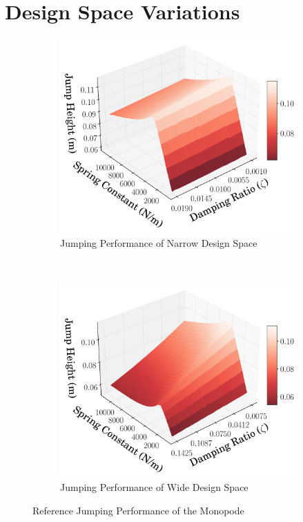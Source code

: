 \section{Design Space Variations}
% 
\begin{figure}[tb!]
        \centering
        \begin{subfigure}{0.75\textwidth}
        \centering
        \includegraphics[width=\linewidth]{figures/Ch4/design_space_narr/Design_3D_Plot_0.01_.pdf}
        \caption{Jumping Performance of Narrow Design Space}
        \label{fig:spring_zeta_narr}
        \end{subfigure} \\
        \begin{subfigure}{0.75\textwidth}
        \centering
        \includegraphics[width=\linewidth]{figures/Ch4/design_space_wide/Design_3D_Plot_0.075_.pdf}
        \caption{Jumping Performance of Wide Design Space}
        \label{fig:spring_zeta_wide}
        \end{subfigure} 
         \caption{Reference Jumping Performance of the Monopode}
         \label{fig:spring_vs_zeta}
\end{figure}


